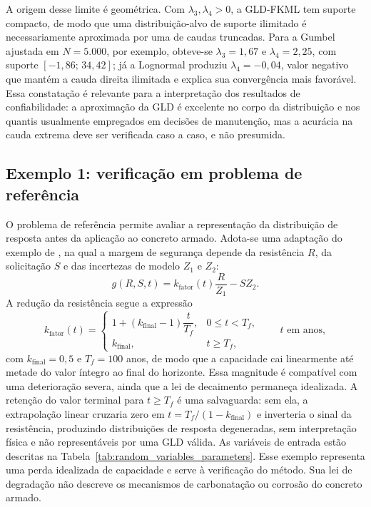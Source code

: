 A origem desse limite é geométrica. Com $\lambda_3, \lambda_4 > 0$, a GLD-FKML tem suporte compacto, de modo que uma distribuição-alvo de suporte ilimitado é necessariamente aproximada por uma de caudas truncadas. Para a Gumbel ajustada em $N = 5.000$, por exemplo, obteve-se $\lambda_3 = 1{,}67$ e $\lambda_4 = 2{,}25$, com suporte $[-1{,}86;\, 34{,}42]$; já a Lognormal produziu $\lambda_4 = -0{,}04$, valor negativo que mantém a cauda direita ilimitada e explica sua convergência mais favorável. Essa constatação é relevante para a interpretação dos resultados de confiabilidade: a aproximação da GLD é excelente no corpo da distribuição e nos quantis usualmente empregados em decisões de manutenção, mas a acurácia na cauda extrema deve ser verificada caso a caso, e não presumida.

\subsection{Exemplo 1: verificação em problema de referência}
\label{subsec:exemplo1}

O problema de referência permite avaliar a representação da distribuição de resposta antes da aplicação ao concreto armado. Adota-se uma adaptação do exemplo de \textcite{pires2024}, na qual a margem de segurança depende da resistência $R$, da solicitação $S$ e das incertezas de modelo $Z_1$ e $Z_2$:
\begin{equation}
    g(R,S,t) = k_{\mathrm{fator}}(t)\frac{R}{Z_1} - SZ_2.
    \label{eq:toy_problem_equation}
\end{equation}
A redução da resistência segue a expressão
\begin{equation}
    k_{\mathrm{fator}}(t) =
    \begin{cases}
        1 + (k_{\mathrm{final}}-1)\dfrac{t}{T_f}, & 0 \leq t < T_f, \\[10pt]
        k_{\mathrm{final}},                        & t \geq T_f,
    \end{cases}
    \qquad t\text{ em anos},
    \label{eq:k_factor_linear}
\end{equation}
com $k_{\mathrm{final}} = 0{,}5$ e $T_f = 100$ anos, de modo que a capacidade cai linearmente até metade do valor íntegro ao final do horizonte. Essa magnitude é compatível com uma deterioração severa, ainda que a lei de decaimento permaneça idealizada. A retenção do valor terminal para $t \geq T_f$ é uma salvaguarda: sem ela, a extrapolação linear cruzaria zero em $t = T_f/(1-k_{\mathrm{final}})$ e inverteria o sinal da resistência, produzindo distribuições de resposta degeneradas, sem interpretação física e não representáveis por uma GLD válida. As variáveis de entrada estão descritas na Tabela~\ref{tab:random_variables_parameters}. Esse exemplo representa uma perda idealizada de capacidade e serve à verificação do método. Sua lei de degradação não descreve os mecanismos de carbonatação ou corrosão do concreto armado.

